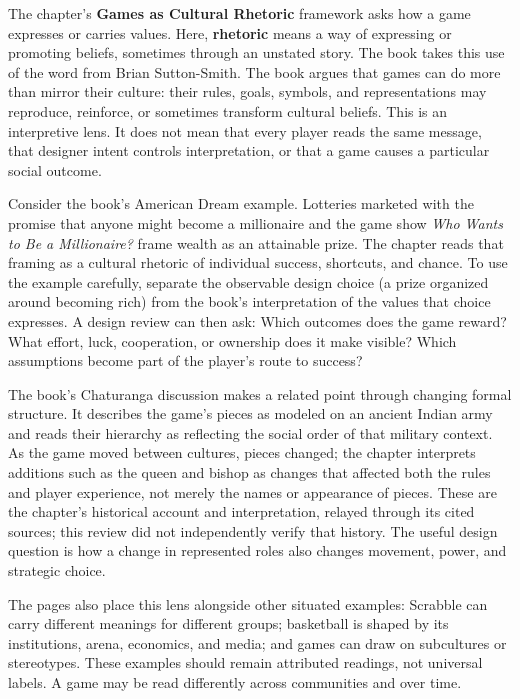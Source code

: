 The chapter's \textbf{Games as Cultural Rhetoric} framework asks how a game expresses or carries values. Here, \textbf{rhetoric} means a way of expressing or promoting beliefs, sometimes through an unstated story. The book takes this use of the word from Brian Sutton-Smith. The book argues that games can do more than mirror their culture: their rules, goals, symbols, and representations may reproduce, reinforce, or sometimes transform cultural beliefs. This is an interpretive lens. It does not mean that every player reads the same message, that designer intent controls interpretation, or that a game causes a particular social outcome.

Consider the book's American Dream example. Lotteries marketed with the promise that anyone might become a millionaire and the game show \emph{Who Wants to Be a Millionaire?} frame wealth as an attainable prize. The chapter reads that framing as a cultural rhetoric of individual success, shortcuts, and chance. To use the example carefully, separate the observable design choice (a prize organized around becoming rich) from the book's interpretation of the values that choice expresses. A design review can then ask: Which outcomes does the game reward? What effort, luck, cooperation, or ownership does it make visible? Which assumptions become part of the player's route to success?

The book's Chaturanga discussion makes a related point through changing formal structure. It describes the game's pieces as modeled on an ancient Indian army and reads their hierarchy as reflecting the social order of that military context. As the game moved between cultures, pieces changed; the chapter interprets additions such as the queen and bishop as changes that affected both the rules and player experience, not merely the names or appearance of pieces. These are the chapter's historical account and interpretation, relayed through its cited sources; this review did not independently verify that history. The useful design question is how a change in represented roles also changes movement, power, and strategic choice.

The pages also place this lens alongside other situated examples: Scrabble can carry different meanings for different groups; basketball is shaped by its institutions, arena, economics, and media; and games can draw on subcultures or stereotypes. These examples should remain attributed readings, not universal labels. A game may be read differently across communities and over time.

